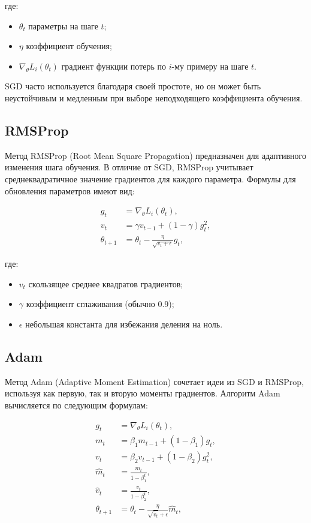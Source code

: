 где:
\begin{itemize}
    \item $\theta_t$ \textendash{} параметры на шаге $t$;
    \item $\eta$ \textendash{} коэффициент обучения;
    \item $\nabla_\theta L_i(\theta_t)$ \textendash{} градиент функции потерь по $i$-му примеру на шаге $t$.
\end{itemize}

SGD часто используется благодаря своей простоте, но он может быть неустойчивым и медленным при выборе неподходящего коэффициента обучения.

\subsection{RMSProp}

Метод RMSProp (Root Mean Square Propagation) предназначен для адаптивного изменения шага обучения. В отличие от SGD, RMSProp учитывает среднеквадратичное значение градиентов для каждого параметра. Формулы для обновления параметров имеют вид:

\begin{align}
    g_t &= \nabla_\theta L_i(\theta_t), \\
    v_t &= \gamma v_{t-1} + (1 - \gamma) g_t^2, \\
    \theta_{t+1} &= \theta_t - \frac{\eta}{\sqrt{v_t + \epsilon}} g_t,
\end{align}

где:
\begin{itemize}
    \item $v_t$ \textendash{} скользящее среднее квадратов градиентов;
    \item $\gamma$ \textendash{} коэффициент сглаживания (обычно $0.9$);
    \item $\epsilon$ \textendash{} небольшая константа для избежания деления на ноль.
\end{itemize}

\subsection{Adam}

Метод Adam (Adaptive Moment Estimation) сочетает идеи из SGD и RMSProp, используя как первую, так и вторую моменты градиентов. Алгоритм Adam вычисляется по следующим формулам:

\begin{align}
    g_t &= \nabla_\theta L_i(\theta_t), \\
    m_t &= \beta_1 m_{t-1} + (1 - \beta_1) g_t, \\
    v_t &= \beta_2 v_{t-1} + (1 - \beta_2) g_t^2, \\
    \hat{m}_t &= \frac{m_t}{1 - \beta_1^t}, \\
    \hat{v}_t &= \frac{v_t}{1 - \beta_2^t}, \\
    \theta_{t+1} &= \theta_t - \frac{\eta}{\sqrt{\hat{v}_t} + \epsilon} \hat{m}_t,
\end{align}

